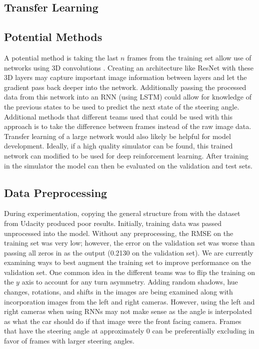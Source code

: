 \documentclass[10pt,twocolumn,letterpaper]{article}
\begin{document}
\subsection{Transfer Learning}




\subsection{Potential Methods}

A potential method is taking the last $n$ frames from the training set allow use of networks using 3D convolutions \cite{Tran_2015_ICCV}. Creating an architecture like ResNet with these 3D layers may capture important image information between layers and let the gradient pass back deeper into the network. Additionally passing the processed data from this network into an RNN (using LSTM) could allow for knowledge of the previous states to be used to predict the next state of the steering angle. Additional methods that different teams used that could be used with this approach is to take the difference between frames instead of the raw image data. Transfer learning of a large network would also likely be helpful for model development. Ideally, if a high quality simulator can be found, this trained network can modified to be used for deep reinforcement learning. After training in the simulator the model can then be evaluated on the validation and test sets.

\subsection{Data Preprocessing}
During experimentation, copying the general structure from \cite{bojarski2016end} with the dataset from Udacity produced poor results. Initially, training data was passed unprocessed into the model. Without any preprocessing, the RMSE on the training set was very low; however, the error on the validation set was worse than passing all zeros in as the output (0.2130 on the validation set). We are currently examining ways to best augment the training set to improve performance on the validation set. One common idea in the different teams was to flip the training on the $y$ axis to account for any turn asymmetry. Adding random shadows, hue changes, rotations, and shifts in the images are being examined along with incorporation images from the left and right cameras. However, using the left and right cameras when using RNNs may not make sense as the angle is interpolated as what the car should do if that image were the front facing camera. Frames that have the steering angle at approximately 0 can be preferentially excluding in favor of frames with larger steering angles.
\end{document}
